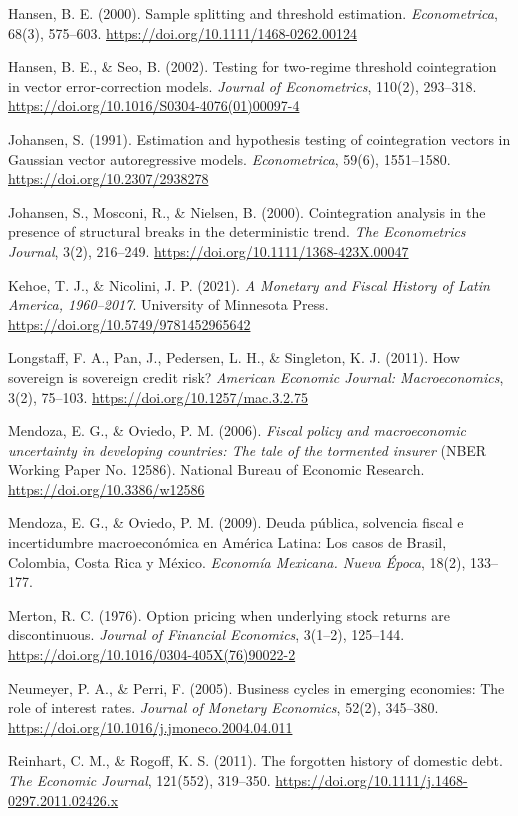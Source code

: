 \documentclass[11pt,a4paper]{article}
\begin{document}
Hansen, B. E. (2000). Sample splitting and threshold estimation. \textit{Econometrica}, 68(3), 575--603. \url{https://doi.org/10.1111/1468-0262.00124}

Hansen, B. E., \& Seo, B. (2002). Testing for two-regime threshold cointegration in vector error-correction models. \textit{Journal of Econometrics}, 110(2), 293--318. \url{https://doi.org/10.1016/S0304-4076(01)00097-4}

Johansen, S. (1991). Estimation and hypothesis testing of cointegration vectors in Gaussian vector autoregressive models. \textit{Econometrica}, 59(6), 1551--1580. \url{https://doi.org/10.2307/2938278}

Johansen, S., Mosconi, R., \& Nielsen, B. (2000). Cointegration analysis in the presence of structural breaks in the deterministic trend. \textit{The Econometrics Journal}, 3(2), 216--249. \url{https://doi.org/10.1111/1368-423X.00047}

Kehoe, T. J., \& Nicolini, J. P. (2021). \textit{A Monetary and Fiscal History of Latin America, 1960--2017}. University of Minnesota Press. \url{https://doi.org/10.5749/9781452965642}

Longstaff, F. A., Pan, J., Pedersen, L. H., \& Singleton, K. J. (2011). How sovereign is sovereign credit risk? \textit{American Economic Journal: Macroeconomics}, 3(2), 75--103. \url{https://doi.org/10.1257/mac.3.2.75}

Mendoza, E. G., \& Oviedo, P. M. (2006). \textit{Fiscal policy and macroeconomic uncertainty in developing countries: The tale of the tormented insurer} (NBER Working Paper No. 12586). National Bureau of Economic Research. \url{https://doi.org/10.3386/w12586}

Mendoza, E. G., \& Oviedo, P. M. (2009). Deuda pública, solvencia fiscal e incertidumbre macroeconómica en América Latina: Los casos de Brasil, Colombia, Costa Rica y México. \textit{Economía Mexicana. Nueva Época}, 18(2), 133--177.

Merton, R. C. (1976). Option pricing when underlying stock returns are discontinuous. \textit{Journal of Financial Economics}, 3(1--2), 125--144. \url{https://doi.org/10.1016/0304-405X(76)90022-2}

Neumeyer, P. A., \& Perri, F. (2005). Business cycles in emerging economies: The role of interest rates. \textit{Journal of Monetary Economics}, 52(2), 345--380. \url{https://doi.org/10.1016/j.jmoneco.2004.04.011}

Reinhart, C. M., \& Rogoff, K. S. (2011). The forgotten history of domestic debt. \textit{The Economic Journal}, 121(552), 319--350. \url{https://doi.org/10.1111/j.1468-0297.2011.02426.x}
\end{document}
